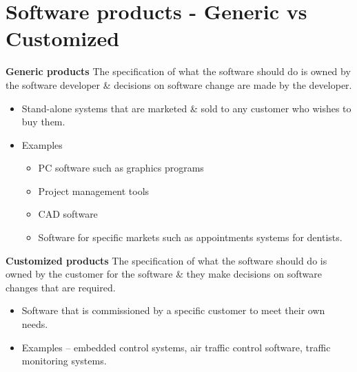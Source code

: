 \documentclass{report}
\begin{document}
\section{Software products - Generic vs Customized}
\noindent \textbf{Generic products} \newline
The specification of what the software should do is owned by the software developer \& decisions on software change are made by the developer.
    \begin{itemize}
      \item Stand-alone systems that are marketed \& sold to any customer who
wishes to buy them.
      \item Examples
        \begin{itemize}
          \item PC software such as graphics programs
          \item Project management tools
          \item CAD software
          \item Software for specific markets such as appointments systems for dentists.
        \end{itemize}
    \end{itemize}
\noindent \textbf{Customized products} \newline
The specification of what the software should do is owned by the customer for the software \& they make decisions on software changes that are required.
    \begin{itemize}
      \item Software that is commissioned by a specific customer to meet their own needs.
      \item Examples – embedded control systems, air traffic control software, traffic monitoring systems.
    \end{itemize}
    
\end{document}
